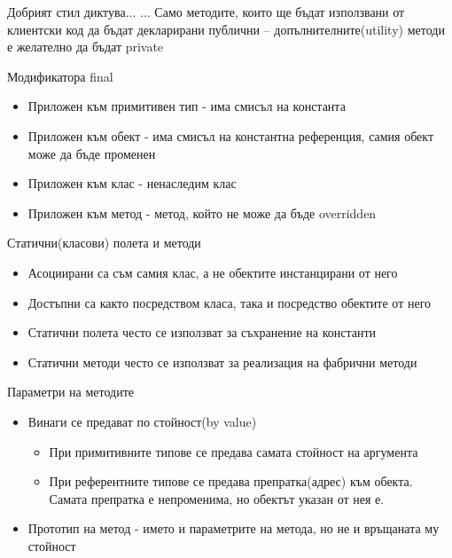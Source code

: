 \documentclass{beamer}
\begin{document}
\begin{frame}{Добрият стил диктува...}
  \transdissolve
  ... Само методите, които ще бъдат
  използвани от клиентски код да бъдат
  декларирани публични –
  допълнителните(utility) методи е
  желателно да бъдат private
\end{frame}

\begin{frame}{Модификатора final}
  \transdissolve
  \begin{itemize}
  \item Приложен към примитивен тип -  има
    смисъл на константа
  \item Приложен към обект -  има смисъл на
    константна референция, самия обект
    може да бъде променен
  \item Приложен към клас -  ненаследим клас
  \item Приложен към метод -  метод, който не
    може да бъде overridden
  \end{itemize}
\end{frame}

\begin{frame}{Статични(класови) полета и методи}
  \transdissolve
  \begin{itemize}
  \item Асоциирани са съм самия клас, а не
    обектите инстанцирани от него
  \item Достъпни са както посредством класа,
    така и посредство обектите от него
  \item Статични полета често се използват за
    съхранение на константи
  \item Статични методи често се използват за
    реализация на фабрични методи
  \end{itemize}
\end{frame}

\begin{frame}{Параметри на методите}
  \transdissolve
  \begin{itemize}
  \item Винаги се предават по стойност(by value)
    \begin{itemize}
    \item При примитивните типове се предава самата стойност на
      аргумента
    \item При референтните типове се предава препратка(адрес) към
      обекта. Самата препратка е непроменима, но обектът указан от
      нея е.
    \end{itemize}
  \item Прототип на метод - името и параметрите на метода, но не и
    връщаната му стойност
  \end{itemize}
\end{frame}
\end{document}

